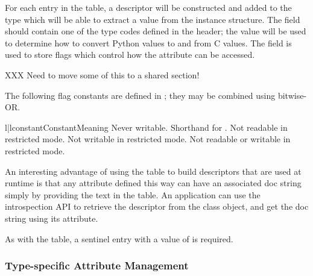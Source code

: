 For each entry in the table, a descriptor will be constructed and
added to the type which will be able to extract a value from the
instance structure.  The  field should contain one of the
type codes defined in the  header; the value will
be used to determine how to convert Python values to and from C
values.  The  field is used to store flags which control
how the attribute can be accessed.

XXX Need to move some of this to a shared section!

The following flag constants are defined in ;
they may be combined using bitwise-OR.

\begin{tableii}{l|l}{constant}{Constant}{Meaning}
         {Never writable.}
         {Shorthand for .}
         {Not readable in restricted mode.}
         {Not writable in restricted mode.}
         {Not readable or writable in restricted mode.}
\end{tableii}

An interesting advantage of using the  table to
build descriptors that are used at runtime is that any attribute
defined this way can have an associated doc string simply by providing
the text in the table.  An application can use the introspection API
to retrieve the descriptor from the class object, and get the
doc string using its  attribute.

As with the  table, a sentinel entry with a
 value of \NULL{} is required.


%


\subsubsection{Type-specific Attribute Management}

